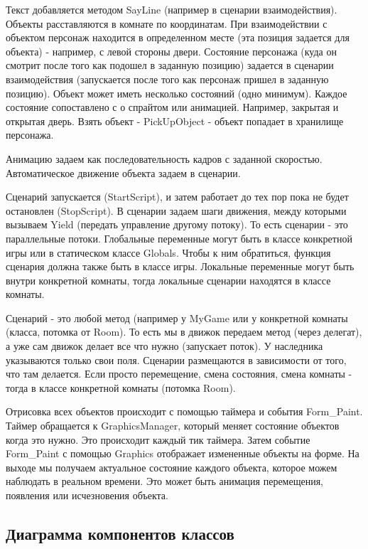 Текст добавляется методом SayLine (например в сценарии взаимодействия).
Объекты расставляются в комнате по координатам. При взаимодействии с объектом персонаж находится в определенном месте (эта позиция задается для объекта) - например, с левой стороны двери. Состояние персонажа (куда он смотрит после того как подошел в заданную позицию) задается в сценарии взаимодействия (запускается после того как персонаж пришел в заданную позицию).
Объект может иметь несколько состояний (одно минимум). Каждое состояние сопоставлено с о спрайтом или анимацией. Например, закрытая и открытая дверь.
Взять объект - PickUpObject - объект попадает в хранилище персонажа.

Анимацию задаем как последовательность кадров с заданной скоростью.
Автоматическое движение объекта задаем в сценарии.

Сценарий запускается (StartScript), и затем работает до тех пор пока не будет остановлен (StopScript).
В сценарии задаем шаги движения, между которыми вызываем Yield (передать управление другому потоку). То есть сценарии - это параллельные потоки.
Глобальные переменные могут быть в классе конкретной игры или в статическом классе Globals. Чтобы к ним обратиться, функция сценария должна также быть в классе игры. Локальные переменные могут быть внутри конкретной комнаты, тогда локальные сценарии находятся в классе комнаты.

Сценарий - это любой метод (например у MyGame или у конкретной комнаты (класса, потомка от Room).
То есть мы в движок передаем метод (через делегат), а уже сам движок делает все что нужно (запускает поток).
У наследника указываются только свои поля. Сценарии размещаются в зависимости от того, что там делается.
Если просто перемещение, смена состояния, смена комнаты - тогда в классе конкретной комнаты (потомка Room).

Отрисовка всех объектов происходит с помощью таймера и события Form\_Paint. Таймер обращается к GraphicsManager, который меняет состояние объектов когда это нужно. Это происходит каждый тик таймера. Затем событие Form\_Paint с помощью Graphics отображает измененные объекты на форме. На выходе мы получаем актуальное состояние каждого объекта, которое можем наблюдать в реальном времени. Это может быть анимация перемещения, появления или исчезновения объекта.


\subsection{Диаграмма компонентов классов}

